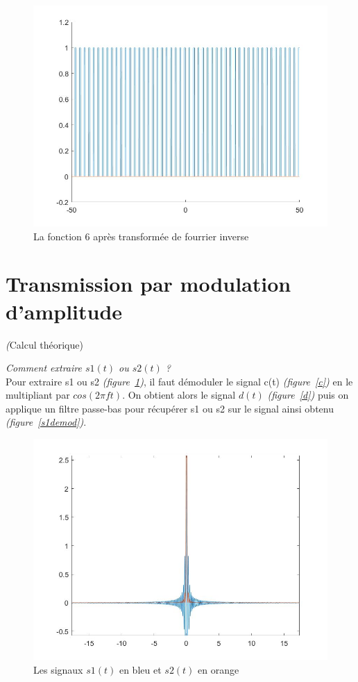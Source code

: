 \documentclass[10pt,a4paper]{article}
\begin{document}
\begin{figure}[H] \begin{center}
\includegraphics[scale=0.35]{fct6.jpg}
\caption{La fonction 6 après transformée de fourrier inverse}
\end{center} \end{figure}


\newpage
\bigskip
\section{Transmission par modulation d'amplitude}
\textit(Calcul théorique)

\textit{Comment extraire $s1(t)$ ou $s2(t)$ ?}\\
Pour extraire s1 ou s2 \textit{(figure~\ref{s1s2})}, il faut démoduler le signal c(t) \textit{(figure~\ref{c})} en le multipliant par $cos(2 \pi f t)$. On obtient alors le signal $d(t)$ \textit{(figure~\ref{d})} puis on applique un filtre passe-bas pour récupérer s1 ou s2 sur le signal ainsi obtenu \textit{(figure~\ref{s1demod})}.

\begin{figure}[h]
\begin{center}
\includegraphics[scale=0.35]{tf_2signaux.jpg}
\caption{Les signaux $s1(t)$  en bleu et $s2(t)$ en orange}
\label{s1s2}
\end{center}
\end{figure}
\end{document}
